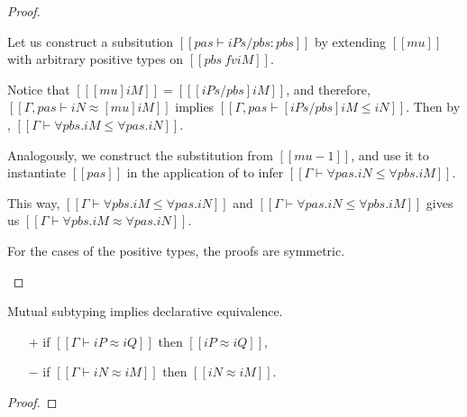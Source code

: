 \begin{proof}
\begin{caseof}
      Let us construct a subsitution $[[pas ⊢ iPs/pbs : pbs]]$ by
      extending $[[mu]]$ with arbitrary positive types on $[[{pbs} \ fv iM]]$.

      Notice that $[[ [mu]iM ]] = [[ [iPs/pbs]iM ]]$, and therefore,
      $[[Γ, pas ⊢ iN ≈ [mu] iM]]$ implies $[[Γ, pas ⊢ [iPs/pbs]iM ≤ iN]]$. Then by
      , $[[Γ ⊢ ∀pbs.iM ≤ ∀pas.iN]]$.

      Analogously, we construct the substitution from $[[mu-1]]$, and use it to
      instantiate $[[pas]]$ in the application of
       to infer $[[Γ ⊢ ∀pas.iN ≤ ∀pbs.iM]]$.

      This way, $[[Γ ⊢ ∀pbs.iM ≤ ∀pas.iN]]$ and $[[Γ ⊢ ∀pas.iN ≤ ∀pbs.iM]]$
      gives us $[[Γ ⊢ ∀pbs.iM ≈ ∀pas.iN]]$.

    \item For the cases of the positive types, the proofs are symmetric.
  \end{caseof}
\end{proof}



\begin{lemma}
  \label{lemma:equiv-completeness}
  Mutual subtyping implies declarative equivalence.
  \begin{itemize}
  \item[$+$] if $[[Γ ⊢ iP ≈ iQ]]$ then $[[iP ≈ iQ]]$,
  \item[$-$] if $[[Γ ⊢ iN ≈ iM]]$ then $[[iN ≈ iM]]$.
  \end{itemize}
\end{lemma}
\begin{proof}
\end{proof}


